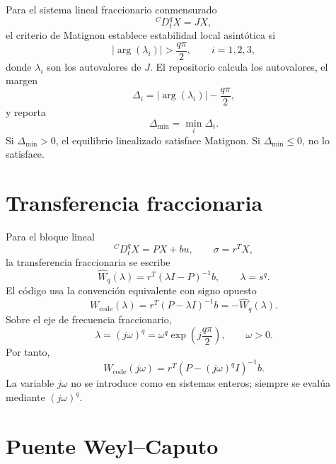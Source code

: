 \documentclass[11pt]{article}
\begin{document}
Para el sistema lineal fraccionario conmensurado
\begin{equation}
{}^C D_t^q X=JX,
\end{equation}
el criterio de Matignon establece estabilidad local asintótica si
\begin{equation}
|\arg(\lambda_i)|>\frac{q\pi}{2},
\qquad i=1,2,3,
\label{eq:matignon}
\end{equation}
donde \(\lambda_i\) son los autovalores de \(J\). El repositorio calcula los autovalores, el margen
\begin{equation}
\Delta_i=|\arg(\lambda_i)|-\frac{q\pi}{2},
\end{equation}
y reporta
\begin{equation}
\Delta_{\min}=\min_i \Delta_i.
\end{equation}
Si \(\Delta_{\min}>0\), el equilibrio linealizado satisface Matignon. Si \(\Delta_{\min}\leq 0\), no lo satisface.

\section{Transferencia fraccionaria}

Para el bloque lineal
\begin{equation}
{}^C D_t^q X=PX+bu,
\qquad
\sigma=r^TX,
\end{equation}
la transferencia fraccionaria se escribe
\begin{equation}
\widehat W_q(\lambda)=r^T(\lambda I-P)^{-1}b,
\qquad
\lambda=s^q.
\label{eq:W_hat}
\end{equation}
El código usa la convención equivalente con signo opuesto
\begin{equation}
W_{\mathrm{code}}(\lambda)=r^T(P-\lambda I)^{-1}b=-\widehat W_q(\lambda).
\label{eq:W_code}
\end{equation}
Sobre el eje de frecuencia fraccionario,
\begin{equation}
\lambda=(j\omega)^q=\omega^q\exp\left(j\frac{q\pi}{2}\right),
\qquad \omega>0.
\label{eq:lambda_frequency}
\end{equation}
Por tanto,
\begin{equation}
W_{\mathrm{code}}(j\omega)=r^T\left(P-(j\omega)^qI\right)^{-1}b.
\label{eq:W_code_freq}
\end{equation}
La variable \(j\omega\) no se introduce como en sistemas enteros; siempre se evalúa mediante \((j\omega)^q\).

\section{Puente Weyl--Caputo}
\end{document}
